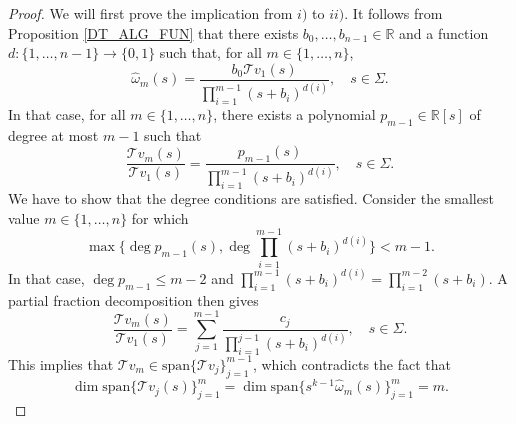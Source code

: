 \documentclass[10pt,a4paper]{amsart}
\newcommand{\R}{\mathbb{R}}
\newcommand{\T}[1]{\mathcal{T}#1}
\newcommand{\om}{\omega}
\newcommand{\spn}[1]{\text{span}\{#1\}}
\begin{document}
\begin{proof}
    We will first prove the implication from $i)$ to $ii)$. It follows from Proposition \ref{DT_ALG_FUN} that there exists $b_0,\dots,b_{n-1}\in\R$ and a function $d:\{1,\dots,n-1\}\to\{0,1\}$ such that, for all $m\in\{1,\dots,n\}$,
    $$ \hat{\om}_m(s) = \frac{b_0 \T{v_1}(s)}{\prod_{i=1}^{m-1} (s+b_i)^{d(i)}},\quad s\in\Sigma.$$
    In that case, for all $m\in\{1,\dots,n\}$, there exists a polynomial $p_{m-1}\in\R[s]$ of degree at most $m-1$ such that
        $$ \frac{\T{v_m}(s)}{\T{v_1}(s)} = \frac{p_{m-1}(s)}{\prod_{i=1}^{m-1}(s+b_i)^{d(i)}},\quad s\in\Sigma.$$
    We have to show that the degree conditions are satisfied. Consider the smallest value $m\in\{1,\dots,n\}$ for which 
    $$\max\{\deg p_{m-1}(s),\deg \prod_{i=1}^{m-1}(s+b_i)^{d(i)}\}<m-1.$$ 
    In that case, $\deg p_{m-1} \leq m-2$ and $\prod_{i=1}^{m-1}(s+b_i)^{d(i)} = \prod_{i=1}^{m-2}(s+b_i)$. A partial fraction decomposition then gives
    $$ \frac{\T{v_m}(s)}{\T{v_1}(s)} = \sum_{j=1}^{m-1} \frac{c_j}{\prod_{i=1}^{j-1}(s+b_i)^{d(i)}},\quad s\in\Sigma. $$
    This implies that $\T{v_m} \in \spn{\T{v_j}}_{j=1}^{m-1}$, which contradicts the fact that 
    $$\dim\spn{\T{v_j}(s)}_{j=1}^{m}=\dim\spn{s^{k-1}\hat{\om}_m(s)}_{j=1}^{m}=m.$$
    

\end{proof}
\end{document}
